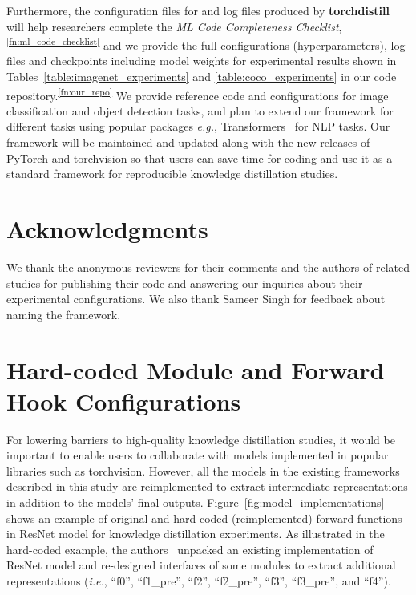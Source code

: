 \documentclass[runningheads]{llncs}
\newcommand{\FRAMEWORK}{{\bf torchdistill}\xspace}
\begin{document}
Furthermore, the configuration files for and log files produced by \FRAMEWORK will help researchers complete the \emph{ML Code Completeness Checklist},\textsuperscript{\ref{fn:ml_code_checklist}} and we provide the full configurations (hyperparameters), log files and checkpoints including model weights for experimental results shown in Tables~\ref{table:imagenet_experiments} and \ref{table:coco_experiments} in our code repository.\textsuperscript{\ref{fn:our_repo}} 
We provide reference code and configurations for image classification and object detection tasks, and plan to extend our framework for different tasks using popular packages \emph{e.g.}, Transformers~\cite{wolf2020transformers} for NLP tasks.
Our framework will be maintained and updated along with the new releases of PyTorch and torchvision so that users can save time for coding and use it as a standard framework for reproducible knowledge distillation studies.

\section*{Acknowledgments}
We thank the anonymous reviewers for their comments and the authors of related studies for publishing their code and answering our inquiries about their experimental configurations.
We also thank Sameer Singh for feedback about naming the framework.













\appendix

\section{Hard-coded Module and Forward Hook Configurations}
\label{appendix:hardcoded}
For lowering barriers to high-quality knowledge distillation studies, it would be important to enable users to collaborate with models implemented in popular libraries such as torchvision.
However, all the models in the existing frameworks described in this study are reimplemented to extract intermediate representations in addition to the models' final outputs.
Figure~\ref{fig:model_implementations} shows an example of original and hard-coded (reimplemented) forward functions in ResNet model for knowledge distillation experiments.
As illustrated in the hard-coded example, the authors~\cite{tian2020contrastive,xu2020knowledge} unpacked an existing implementation of ResNet model and re-designed interfaces of some modules to extract additional representations (\emph{i.e.}, ``f0'', ``f1\_pre'', ``f2'', ``f2\_pre'', ``f3'', ``f3\_pre'', and ``f4'').
\end{document}
